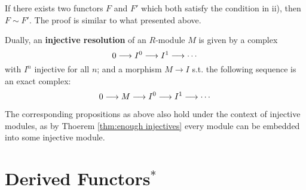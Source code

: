 \documentclass{article}
\begin{document}
\begin{remark}
    If there exists two functors $F$ and $F'$ which both satisfy the condition in ii), then $F \sim F'$. The proof is similar to what presented above.
\end{remark}

\begin{definition}
    Dually, an \textbf{injective resolution} of an $R$-module $M$ is given by a complex 
    \[
        0 \longrightarrow I^0 \longrightarrow I^1 \longrightarrow \cdots
    \]
    with $I^n$ injective for all $n$; and a morphism $M \to I$ s.t. the following sequence is an exact complex:
    \[
        0 \longrightarrow M \longrightarrow I^0 \longrightarrow I^1 \longrightarrow \cdots
    \]
\end{definition}

\begin{remark}
    The corresponding propositions as above also hold under the context of injective modules, as by Thoerem \ref{thm:enough injectives} every module can be embedded into some injective module. 
\end{remark}

\section{Derived Functors$^*$}
\end{document}
